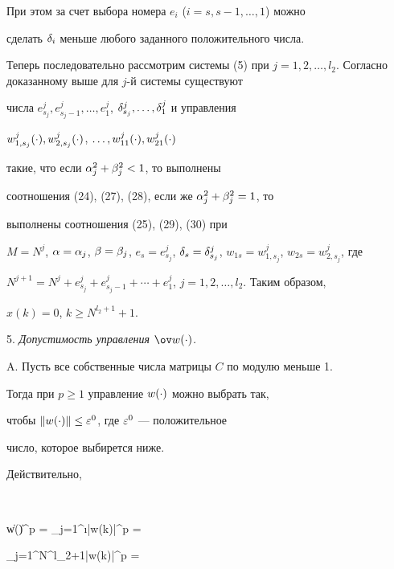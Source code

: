 При этом за счет выбора номера $e_i$ ($i= s,s-1, \dotsc, 1$) можно


сделать $\delta_i$ меньше любого заданного положительного числа.





Теперь последовательно рассмотрим системы (5) при $j=1,2,\dotsc,


l_2$. Согласно доказанному выше для $j$-й системы существуют


числа $e^j_{s_j}, e^j_{s_j-1}, \dotsc, e^j_1$, $\d^j_{s_j}, \dotsc,


\d^j_1$ и управления


$w^j_{1,s_j}(\cdot), w^j_{2,s_j}(\cdot)$, $\dotsc, w^j_{11}(\cdot),w^j_{21}(\cdot)$




такие, что если $\alpha_j^2 + \beta_j^2 < 1$, то выполнены


соотношения (24), (27), (28), если же $\alpha_j^2 + \beta_j^2 = 1$, то


выполнены соотношения (25), (29), (30) при


$M = N^{j}$, $\a = \a_j$, $\b = \b_j$, $e_s = e^j_{s_j}$, $\d_s =


\d^j_{s_j}$, $w_{1s} = w^j_{1,s_j}$, $w_{2s} = w^j_{2,s_j}$, где


$N^{j+1} = N^{j} + e^{j}_{s_{j}} + e^{j}_{s_{j}-1}+\dotsb+


e^{j}_1$, $j=1,2,\dotsc,l_2$. Таким образом,


$x(k) = 0$, $k \geq N^{l_2+1}+1$.


\medskip





5. {\it Допустимость управления $\ov w(\cc) $.}





A. Пусть все собственные числа матрицы $C $ по модулю меньше 1.


Тогда при $p \geq 1 $ управление $w(\cdot) $ можно выбрать так,


чтобы $\|w(\cdot)\| \leq \varepsilon^0$, где $\varepsilon^0$ --- положительное 


число, которое выбирется ниже.


Действительно,


$$


\|w(\cc)\|^p = \sum\limits_{j=1}^{\i}|w(k)|^p =


\sum\limits_{j=1}^{N^{l_2}+1}|w(k)|^p =


